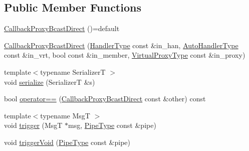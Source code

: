 \subsection*{Public Member Functions}
\begin{DoxyCompactItemize}
\item 
\hyperlink{structvt_1_1pipe_1_1callback_1_1_callback_proxy_bcast_direct_a4e1553252066be693d9471399a099d57}{Callback\+Proxy\+Bcast\+Direct} ()=default
\item 
\hyperlink{structvt_1_1pipe_1_1callback_1_1_callback_proxy_bcast_direct_a3249cc4b163da34218abb05efe207278}{Callback\+Proxy\+Bcast\+Direct} (\hyperlink{namespacevt_af64846b57dfcaf104da3ef6967917573}{Handler\+Type} const \&in\+\_\+han, \hyperlink{structvt_1_1pipe_1_1callback_1_1_callback_proxy_bcast_direct_a543cd86434430bd048952534f4fbc128}{Auto\+Handler\+Type} const \&in\+\_\+vrt, bool const \&in\+\_\+member, \hyperlink{namespacevt_a1b417dd5d684f045bb58a0ede70045ac}{Virtual\+Proxy\+Type} const \&in\+\_\+proxy)
\item 
{\footnotesize template$<$typename SerializerT $>$ }\\void \hyperlink{structvt_1_1pipe_1_1callback_1_1_callback_proxy_bcast_direct_aaa0cd50e42f5585d82425c703e0383b1}{serialize} (SerializerT \&s)
\item 
bool \hyperlink{structvt_1_1pipe_1_1callback_1_1_callback_proxy_bcast_direct_a47efba43a917e20ecdbaa513e502272b}{operator==} (\hyperlink{structvt_1_1pipe_1_1callback_1_1_callback_proxy_bcast_direct}{Callback\+Proxy\+Bcast\+Direct} const \&other) const
\item 
{\footnotesize template$<$typename MsgT $>$ }\\void \hyperlink{structvt_1_1pipe_1_1callback_1_1_callback_proxy_bcast_direct_a8d2fcd9c80915400e96c9094ba26c9d4}{trigger} (MsgT $\ast$msg, \hyperlink{namespacevt_ac9852acda74d1896f48f406cd72c7bd3}{Pipe\+Type} const \&pipe)
\item 
void \hyperlink{structvt_1_1pipe_1_1callback_1_1_callback_proxy_bcast_direct_aaa09586f609c545e3c0bff45dd5b6cbe}{trigger\+Void} (\hyperlink{namespacevt_ac9852acda74d1896f48f406cd72c7bd3}{Pipe\+Type} const \&pipe)
\end{DoxyCompactItemize}
